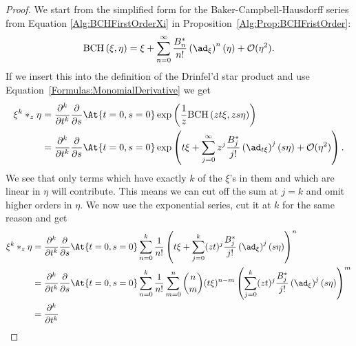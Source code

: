 \begin{proof}
    We start from the simplified form for the Baker-Campbell-Hausdorff 
    series from Equation \eqref{Alg:BCHFirstOrderXi} in 
    Proposition~\ref{Alg:Prop:BCHFristOrder}:
    \begin{equation*}
		\bch{\xi}{\eta}
		=
		\xi 
		+ 
		\sum\limits_{n = 0}^{\infty}
		\frac{B_n^*}{n!}
		\left( \ad_{\xi} \right)^n (\eta)
		+
		\mathcal{O}(\eta^2).
    \end{equation*}
    If we insert this into the definition of the Drinfel'd star product 
    and use Equation~\eqref{Formulas:MonomialDerivative} we get
    \begin{align*}
        \xi^k \ast_z \eta
        & =
        \frac{\partial^k}{\partial t^k}
        \frac{\partial}{\partial s}
        \At{t=0, s=0}
        \exp \left(
            \frac{1}{z} \bch{z t \xi}{z s \eta}
        \right)
        \\
        & =
        \frac{\partial^k}{\partial t^k}
        \frac{\partial}{\partial s}
        \At{t=0, s=0}
        \exp \left(
            t \xi + \sum\limits_{j=0}^{\infty}
            z^j \frac{B_j^*}{j!}
            \left( \ad_{t \xi} \right)^j
            (s \eta)
            + \mathcal{O}(\eta^2)
        \right).
    \end{align*}
    We see that only terms which have exactly $k$ of the
    $\xi$'s in them and which are linear in $\eta$ will
    contribute. This means we can cut off the sum at $j = k$ and omit 
    higher orders in $\eta$. We now use the exponential series,
    cut it at $k$ for the same reason and get
    \begin{align*}
        \xi^k \ast_z \eta
        & =
        \frac{\partial^k}{\partial t^k}
        \frac{\partial}{\partial s}
        \At{t=0, s=0}
        \sum\limits_{n=0}^{k}
        \frac{1}{n!}
        \left(
            t \xi
            +
            \sum\limits_{j=0}^{k}
            (zt)^j \frac{B_j^*}{j!}
            \left(\ad_{\xi}\right)^j
            (s \eta)
        \right)^n
        \\
        & =
        \frac{\partial^k}{\partial t^k}
        \frac{\partial}{\partial s}
        \At{t=0, s=0}
        \sum\limits_{n=0}^{k}
        \frac{1}{n!}
        \sum\limits_{m = 0}^n
        \binom{n}{m}
        (t \xi)^{n - m}
        \left(
            \sum\limits_{j=0}^{k}
            (zt)^j \frac{B_j^*}{j!}
            \left(\ad_{\xi}\right)^j
            (s \eta)
        \right)^m
        \\
        & =
        \frac{\partial^k}{\partial t^k}

\end{align*}
\end{proof}

